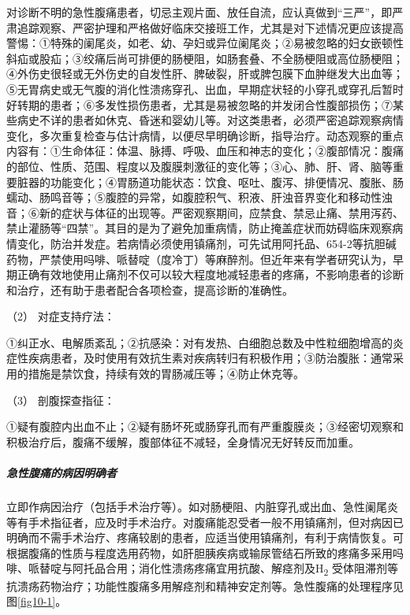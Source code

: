 对诊断不明的急性腹痛患者，切忌主观片面、放任自流，应认真做到“三严”，即严肃追踪观察、严密护理和严格做好临床交接班工作，尤其是对下述情况更应该提高警惕：①特殊的阑尾炎，如老、幼、孕妇或异位阑尾炎；②易被忽略的妇女嵌顿性斜疝或股疝；③绞痛后尚可排便的肠梗阻，如肠套叠、不全肠梗阻或高位肠梗阻；④外伤史很轻或无外伤史的自发性肝、脾破裂，肝或脾包膜下血肿继发大出血等；⑤无胃病史或无气腹的消化性溃疡穿孔、出血，早期症状轻的小穿孔或穿孔后暂时好转期的患者；⑥多发性损伤患者，尤其是易被忽略的并发闭合性腹部损伤；⑦某些病史不详的患者如休克、昏迷和婴幼儿等。对这类患者，必须严密追踪观察病情变化，多次重复检查与估计病情，以便尽早明确诊断，指导治疗。动态观察的重点内容有：①生命体征：体温、脉搏、呼吸、血压和神志的变化；②腹部情况：腹痛的部位、性质、范围、程度以及腹膜刺激征的变化等；③心、肺、肝、肾、脑等重要脏器的功能变化；④胃肠道功能状态：饮食、呕吐、腹泻、排便情况、腹胀、肠蠕动、肠鸣音等；⑤腹腔的异常，如腹腔积气、积液、肝浊音界变化和移动性浊音；⑥新的症状与体征的出现等。严密观察期间，应禁食、禁忌止痛、禁用泻药、禁止灌肠等“四禁”。其目的是为了避免加重病情，防止掩盖症状而妨碍临床观察病情变化，防治并发症。若病情必须使用镇痛剂，可先试用阿托品、654-2等抗胆碱药物，严禁使用吗啡、哌替啶（度冷丁）等麻醉剂。但近年来有学者研究认为，早期正确有效地使用止痛剂不仅可以较大程度地减轻患者的疼痛，不影响患者的诊断和治疗，还有助于患者配合各项检查，提高诊断的准确性。

\hypertarget{text00026.htmlux5cux23CHP1-10-3-1-2-2}{}
（2） 对症支持疗法：

①纠正水、电解质紊乱；②抗感染：对有发热、白细胞总数及中性粒细胞增高的炎症性疾病患者，及时使用有效抗生素对疾病转归有积极作用；③防治腹胀：通常采用的措施是禁饮食，持续有效的胃肠减压等；④防止休克等。

\hypertarget{text00026.htmlux5cux23CHP1-10-3-1-2-3}{}
（3） 剖腹探查指征：

①疑有腹腔内出血不止；②疑有肠坏死或肠穿孔而有严重腹膜炎；③经密切观察和积极治疗后，腹痛不缓解，腹部体征不减轻，全身情况无好转反而加重。

\subparagraph{急性腹痛的病因明确者}

立即作病因治疗（包括手术治疗等）。如对肠梗阻、内脏穿孔或出血、急性阑尾炎等有手术指征者，应及时手术治疗。对腹痛能忍受者一般不用镇痛剂，但对病因已明确而不需手术治疗、疼痛较剧的患者，应适当使用镇痛剂，有利于病情恢复。可根据腹痛的性质与程度选用药物，如肝胆胰疾病或输尿管结石所致的疼痛多采用吗啡、哌替啶与阿托品合用；消化性溃疡疼痛宜用抗酸、解痉剂及H\textsubscript{2}
受体阻滞剂等抗溃疡药物治疗；功能性腹痛多用解痉剂和精神安定剂等。急性腹痛的处理程序见图\ref{fig10-1}。

